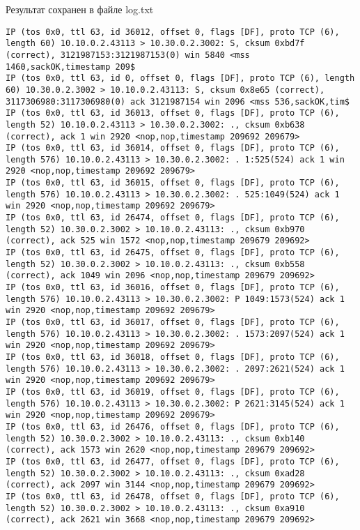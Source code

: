 \documentclass[a4paper,12pt]{article}
\begin{document}
Результат сохранен в файле log.txt
\begin{lstlisting}
IP (tos 0x0, ttl 63, id 36012, offset 0, flags [DF], proto TCP (6), length 60) 10.10.0.2.43113 > 10.30.0.2.3002: S, cksum 0xbd7f (correct), 3121987153:3121987153(0) win 5840 <mss 1460,sackOK,timestamp 209$
IP (tos 0x0, ttl 63, id 0, offset 0, flags [DF], proto TCP (6), length 60) 10.30.0.2.3002 > 10.10.0.2.43113: S, cksum 0x8e65 (correct), 3117306980:3117306980(0) ack 3121987154 win 2096 <mss 536,sackOK,tim$
IP (tos 0x0, ttl 63, id 36013, offset 0, flags [DF], proto TCP (6), length 52) 10.10.0.2.43113 > 10.30.0.2.3002: ., cksum 0xb638 (correct), ack 1 win 2920 <nop,nop,timestamp 209692 209679>
IP (tos 0x0, ttl 63, id 36014, offset 0, flags [DF], proto TCP (6), length 576) 10.10.0.2.43113 > 10.30.0.2.3002: . 1:525(524) ack 1 win 2920 <nop,nop,timestamp 209692 209679>
IP (tos 0x0, ttl 63, id 36015, offset 0, flags [DF], proto TCP (6), length 576) 10.10.0.2.43113 > 10.30.0.2.3002: . 525:1049(524) ack 1 win 2920 <nop,nop,timestamp 209692 209679>
IP (tos 0x0, ttl 63, id 26474, offset 0, flags [DF], proto TCP (6), length 52) 10.30.0.2.3002 > 10.10.0.2.43113: ., cksum 0xb970 (correct), ack 525 win 1572 <nop,nop,timestamp 209679 209692>
IP (tos 0x0, ttl 63, id 26475, offset 0, flags [DF], proto TCP (6), length 52) 10.30.0.2.3002 > 10.10.0.2.43113: ., cksum 0xb558 (correct), ack 1049 win 2096 <nop,nop,timestamp 209679 209692>
IP (tos 0x0, ttl 63, id 36016, offset 0, flags [DF], proto TCP (6), length 576) 10.10.0.2.43113 > 10.30.0.2.3002: P 1049:1573(524) ack 1 win 2920 <nop,nop,timestamp 209692 209679>
IP (tos 0x0, ttl 63, id 36017, offset 0, flags [DF], proto TCP (6), length 576) 10.10.0.2.43113 > 10.30.0.2.3002: . 1573:2097(524) ack 1 win 2920 <nop,nop,timestamp 209692 209679>
IP (tos 0x0, ttl 63, id 36018, offset 0, flags [DF], proto TCP (6), length 576) 10.10.0.2.43113 > 10.30.0.2.3002: . 2097:2621(524) ack 1 win 2920 <nop,nop,timestamp 209692 209679>
IP (tos 0x0, ttl 63, id 36019, offset 0, flags [DF], proto TCP (6), length 576) 10.10.0.2.43113 > 10.30.0.2.3002: P 2621:3145(524) ack 1 win 2920 <nop,nop,timestamp 209692 209679>
IP (tos 0x0, ttl 63, id 26476, offset 0, flags [DF], proto TCP (6), length 52) 10.30.0.2.3002 > 10.10.0.2.43113: ., cksum 0xb140 (correct), ack 1573 win 2620 <nop,nop,timestamp 209679 209692>
IP (tos 0x0, ttl 63, id 26477, offset 0, flags [DF], proto TCP (6), length 52) 10.30.0.2.3002 > 10.10.0.2.43113: ., cksum 0xad28 (correct), ack 2097 win 3144 <nop,nop,timestamp 209679 209692>
IP (tos 0x0, ttl 63, id 26478, offset 0, flags [DF], proto TCP (6), length 52) 10.30.0.2.3002 > 10.10.0.2.43113: ., cksum 0xa910 (correct), ack 2621 win 3668 <nop,nop,timestamp 209679 209692>

\end{lstlisting}
\end{document}
